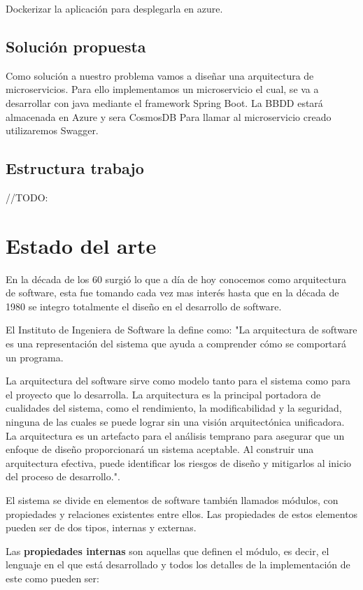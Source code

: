 \documentclass[12pt]{report} %
\begin{document}
	Dockerizar la aplicación para desplegarla en azure.
		
	\section{Solución propuesta}
	Como solución a nuestro problema vamos a diseñar una arquitectura de microservicios.
	Para ello implementamos un microservicio el cual, se va a desarrollar con java mediante el framework Spring Boot.
	La BBDD estará almacenada en Azure y sera CosmosDB
	Para llamar al microservicio creado utilizaremos Swagger.
	
	\section{Estructura trabajo}
	//TODO:
	\chapter{Estado del arte}

	En la década de los 60 surgió lo que a día de hoy conocemos como arquitectura de software, esta fue tomando cada vez mas interés hasta que en la década de 1980 se integro totalmente el diseño en el desarrollo de software. 
	
	El Instituto de Ingeniera de Software la define como:
	"La arquitectura de software es una representación del sistema que ayuda a comprender cómo se comportará un programa. 
	
	La arquitectura del software sirve como modelo tanto para el sistema como para el proyecto que lo desarrolla. La arquitectura es la principal portadora de cualidades del sistema, como el rendimiento, la modificabilidad y la seguridad, ninguna de las cuales se puede lograr sin una visión arquitectónica unificadora. La arquitectura es un artefacto para el análisis temprano para asegurar que un enfoque de diseño proporcionará un sistema aceptable. Al construir una arquitectura efectiva, puede identificar los riesgos de diseño y mitigarlos al inicio del proceso de desarrollo."\cite{SoftwareEngineeringInstitute}. 
	
	El sistema se divide en elementos de software también llamados módulos, con propiedades y relaciones existentes entre ellos. Las propiedades de estos elementos pueden ser de dos tipos, internas y externas.
	
	Las \textbf{propiedades internas}  son aquellas que definen el módulo, es decir, el lenguaje en el que está desarrollado y todos los detalles de la implementación de este como pueden ser:
	
\end{document}

